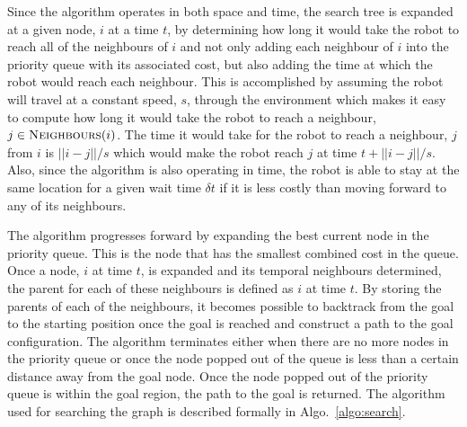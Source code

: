 Since the algorithm operates in both space and time, the search tree is
expanded at a given node, $i$ at a time $t$, by determining how long it would
take the robot to reach all of the neighbours of $i$ and not only adding each
neighbour of $i$ into the priority queue with its associated cost, but also
adding the time at which the robot would reach each neighbour. This is
accomplished by assuming the robot will travel at a constant speed, $s$,
through the environment which makes it easy to compute how long it would take
the robot to reach a neighbour, $j \in \Function{Neighbours}(i)$. The time it
would take for the robot to reach a neighbour, $j$ from $i$ is $||i - j|| / s$
which would make the robot reach $j$ at time $t + ||i - j|| / s$.  Also, since
the algorithm is also operating in time, the robot is able to stay at the same
location for a given wait time $\delta t$ if it is less costly than moving
forward to any of its neighbours.

The algorithm progresses forward by expanding the best current node in the
priority queue. This is the node that has the smallest combined cost in the
queue.  Once a node, $i$ at time $t$, is expanded and its temporal neighbours
determined, the parent for each of these neighbours is defined as $i$ at time
$t$. By storing the parents of each of the neighbours, it becomes possible to
backtrack from the goal to the starting position once the goal is reached and
construct a path to the goal configuration. The algorithm terminates either
when there are no more nodes in the priority queue or once the node popped out
of the queue is less than a certain distance away from the goal node. Once the
node popped out of the priority queue is within the goal region, the path to
the goal is returned. The algorithm used for searching the graph is described
formally in Algo.~\ref{algo:search}.

